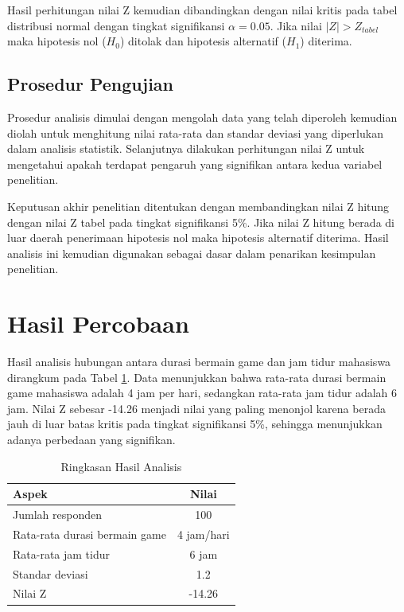 \documentclass[metlit,article,accept,pdftex,moreauthors]{Definitions/mdpi}
\begin{document}
Hasil perhitungan nilai Z kemudian dibandingkan dengan nilai kritis pada tabel distribusi normal dengan tingkat signifikansi $\alpha = 0.05$. Jika nilai $|Z| > Z_{tabel}$ maka hipotesis nol ($H_0$) ditolak dan hipotesis alternatif ($H_1$) diterima.

\subsection{Prosedur Pengujian}

Prosedur analisis dimulai dengan mengolah data yang telah diperoleh kemudian diolah untuk menghitung nilai rata-rata dan standar deviasi yang diperlukan dalam analisis statistik. Selanjutnya dilakukan perhitungan nilai Z untuk mengetahui apakah terdapat pengaruh yang signifikan antara kedua variabel penelitian.

Keputusan akhir penelitian ditentukan dengan membandingkan nilai Z hitung dengan nilai Z tabel pada tingkat signifikansi 5\%. Jika nilai Z hitung berada di luar daerah penerimaan hipotesis nol maka hipotesis alternatif diterima. Hasil analisis ini kemudian digunakan sebagai dasar dalam penarikan kesimpulan penelitian.



\vspace{5pt}
\section{Hasil Percobaan}

Hasil analisis hubungan antara durasi bermain game dan jam tidur mahasiswa dirangkum pada Tabel \ref{tab:params}. Data menunjukkan bahwa rata-rata durasi bermain game mahasiswa adalah 4 jam per hari, sedangkan rata-rata jam tidur adalah 6 jam. Nilai Z sebesar -14.26 menjadi nilai yang paling menonjol karena berada jauh di luar batas kritis pada tingkat signifikansi 5\%, sehingga menunjukkan adanya perbedaan yang signifikan.

\begin{table}[H]
\centering
\caption{Ringkasan Hasil Analisis}
\label{tab:params}
\begin{tabular}{lc}
\toprule
Aspek & Nilai \\ 
\midrule
Jumlah responden & 100 \\
Rata-rata durasi bermain game & 4 jam/hari \\
Rata-rata jam tidur & 6 jam \\
Standar deviasi & 1.2 \\
Nilai Z & -14.26 \\
\bottomrule
\end{tabular}
\end{table}
\end{document}
